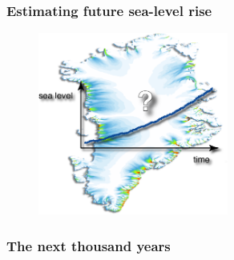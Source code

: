 \documentclass[hide notes,intlimits]{beamer}
\begin{document}
\begin{frame}
  \frametitle{Estimating future sea-level rise}
  \begin{figure}
    \includegraphics[height=6cm]{grn1km_speed_slr}
  \end{figure}
\end{frame}



\begin{frame}
  \frametitle{The next thousand years}
  \begin{figure}
  \end{figure}
\end{frame}
\end{document}
